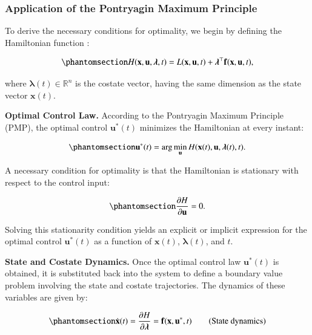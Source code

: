 \documentclass[
  number,
  preprint]{elsarticle}
\begin{document}
\subsubsection{Application of the Pontryagin Maximum
Principle}\label{application-of-the-pontryagin-maximum-principle}

To derive the necessary conditions for optimality, we begin by defining
the Hamiltonian function \citep{pinch1995optimal}:

\begin{equation}\protect\phantomsection\label{eq-ch2-hamiltonian}{
H(\mathbf{x}, \mathbf{u}, \boldsymbol{\lambda}, t) = L(\mathbf{x}, \mathbf{u}, t) + \boldsymbol{\lambda}^\top \mathbf{f}(\mathbf{x}, \mathbf{u}, t),
}\end{equation}

where \(\boldsymbol{\lambda}(t) \in \mathbb{R}^n\) is the costate
vector, having the same dimension as the state vector \(\mathbf{x}(t)\).

\textbf{Optimal Control Law.} According to the Pontryagin Maximum
Principle (PMP), the optimal control \(\mathbf{u}^*(t)\) minimizes the
Hamiltonian at every instant:

\begin{equation}\protect\phantomsection\label{eq-ch2-optimal-control}{
\mathbf{u}^*(t) = \arg\min_{\mathbf{u}} H(\mathbf{x}(t), \mathbf{u}, \boldsymbol{\lambda}(t), t).
}\end{equation}

A necessary condition for optimality is that the Hamiltonian is
stationary with respect to the control input:

\begin{equation}\protect\phantomsection\label{eq-ch2-control-stationarity}{
\frac{\partial H}{\partial \mathbf{u}} = 0.
}\end{equation}

Solving this stationarity condition yields an explicit or implicit
expression for the optimal control \(\mathbf{u}^*(t)\) as a function of
\(\mathbf{x}(t)\), \(\boldsymbol{\lambda}(t)\), and \(t\).

\textbf{State and Costate Dynamics.} Once the optimal control law
\(\mathbf{u}^*(t)\) is obtained, it is substituted back into the system
to define a boundary value problem involving the state and costate
trajectories. The dynamics of these variables are given by:

\begin{equation}\protect\phantomsection\label{eq-ch2-state-dynamics}{
\dot{\mathbf{x}}(t) = \frac{\partial H}{\partial \boldsymbol{\lambda}} = \mathbf{f}(\mathbf{x}, \mathbf{u}^*, t) \tag{State dynamics}
}\end{equation}
\end{document}
